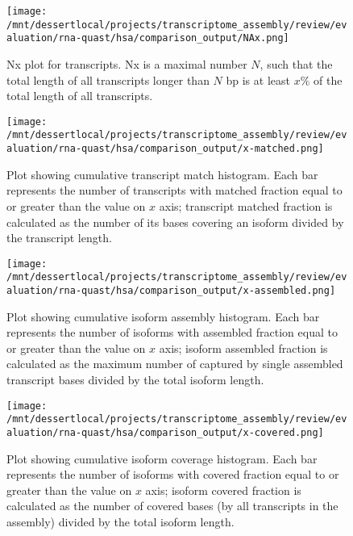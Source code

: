 \documentclass[12pt,a4paper]{article}
\begin{document}
\begin{figure}[t]
\centering
\texttt{[image: /mnt/dessertlocal/projects/transcriptome\_assembly/review/evaluation/rna-quast/hsa/comparison\_output/NAx.png]}
\caption{Nx plot for transcripts. Nx is a maximal number $N$, such that the total length of all transcripts longer than $N$ bp is at least $x\%$ of the total length of all transcripts.}
\end{figure}
\FloatBarrier
\clearpage


\begin{figure}[t]
\centering
\texttt{[image: /mnt/dessertlocal/projects/transcriptome\_assembly/review/evaluation/rna-quast/hsa/comparison\_output/x-matched.png]}
\caption{Plot showing cumulative transcript match histogram. Each bar represents the number of transcripts with matched fraction equal to or greater than the value on $x$ axis; transcript matched fraction is calculated as the number of its bases covering an isoform divided by the transcript length.}
\end{figure}
\FloatBarrier
\clearpage


\begin{figure}[t]
\centering
\texttt{[image: /mnt/dessertlocal/projects/transcriptome\_assembly/review/evaluation/rna-quast/hsa/comparison\_output/x-assembled.png]}
\caption{Plot showing cumulative isoform assembly histogram. Each bar represents the number of isoforms with assembled fraction equal to or greater than the value on $x$ axis; isoform assembled fraction is calculated as the maximum number of captured by single assembled transcript bases divided by the total isoform length.}
\end{figure}
\FloatBarrier
\clearpage


\begin{figure}[t]
\centering
\texttt{[image: /mnt/dessertlocal/projects/transcriptome\_assembly/review/evaluation/rna-quast/hsa/comparison\_output/x-covered.png]}
\caption{Plot showing cumulative isoform coverage histogram. Each bar represents the number of isoforms with covered fraction equal to or greater than the value on $x$ axis; isoform covered fraction is calculated as the number of covered bases (by all transcripts in the assembly) divided by the total isoform length.}
\end{figure}
\FloatBarrier
\clearpage
\end{document}
